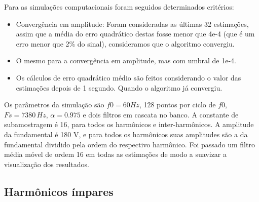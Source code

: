 Para as simulações computacionais foram seguidos determinados critérios:

\begin{itemize}
	\item Convergência em amplitude: Foram consideradas as últimas 32 estimações, assim que a média do erro quadrático destas fosse menor que 4e-4 (que é um erro menor que 2\% do sinal), consideramos que o algoritmo convergiu.
	\item O mesmo para a convergência em amplitude, mas com umbral de 1e-4.
	\item Os cálculos de erro quadrático médio são feitos considerando o valor das estimações depois de 1 segundo. Quando o algoritmo já convergiu.
\end{itemize}

Os parâmetros da simulação são $f0=60Hz$, 128 pontos por ciclo de $f0$, $Fs=7380 \,Hz$, $\alpha=0.975$ e dois filtros em cascata no banco. A constante de subamostragem é 16, para todos os harmônicos e inter-harmônicos. A amplitude da fundamental é 180 V, e para todos os harmônicos suas amplitudes são a da fundamental dividido pela ordem do respectivo harmônico. Foi passado um filtro média móvel de ordem 16 em todas as estimações de modo a suavizar a visualização dos resultados.

\subsection{Harmônicos ímpares}

